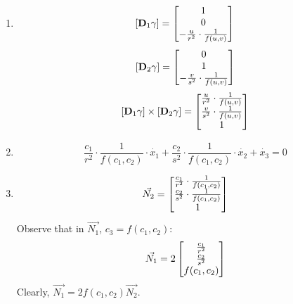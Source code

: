 \documentclass{homework}
\begin{document}
\begin{problem}{3}
\begin{enumerate}
\item
$$[\mathbf{D}_1\gamma] = \begin{bmatrix}1\\0\\
-\frac{u}{r^2}\cdot\frac{1}{f(u, v)}\end{bmatrix}$$
$$[\mathbf{D}_2\gamma] = \begin{bmatrix}0\\1\\
-\frac{v}{s^2}\cdot\frac{1}{f(u, v)}\end{bmatrix}$$
$$[\mathbf{D}_1\gamma] \times [\mathbf{D}_2\gamma] =
\begin{bmatrix}
\frac{u}{r^2}\cdot\frac{1}{f(u, v)}\\
\frac{v}{s^2}\cdot\frac{1}{f(u, v)}\\
1\end{bmatrix}$$

\item
$$\frac{c_1}{r^2}\cdot\frac{1}{f(c_1, c_2)} \cdot \dot{x_1} +
  \frac{c_2}{s^2}\cdot\frac{1}{f(c_1, c_2)} \cdot \dot{x_2} +
  \dot{x_3} = 0$$

\item
$$\vec{N_2} = \begin{bmatrix}
\frac{c_1}{r^2}\cdot\frac{1}{f(c_1, c_2)}\\
\frac{c_2}{s^2}\cdot\frac{1}{f(c_1, c_2)}\\
1\end{bmatrix}$$
Observe that in $\vec{N_1}$, $c_3 = f(c_1, c_2)$:
$$\vec{N_1} = 2\begin{bmatrix}\frac{c_1}{r^2}\\\frac{c_2}{s^2}\\f(c_1, c_2)\end{bmatrix}$$
Clearly, $\vec{N_1} = 2f(c_1, c_2)\vec{N_2}$. \QED
\end{enumerate}
\end{problem}
\end{document}
